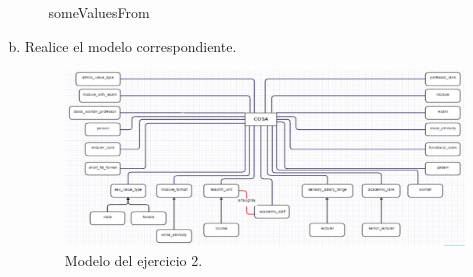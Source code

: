 \documentclass[a4paper,12pt,twoside,final,spanish]{article}
\begin{document}
\begin{enumerate}[a.]
\begin{itemize}
	someValuesFrom \\
		
	\end{itemize}

\item Realice el modelo correspondiente.

\begin{figure}[htbp]
\centerline{\includegraphics[width=\linewidth]{ej2}}
\caption{Modelo del ejercicio 2.}
\label{fig:ej2}
\end{figure}

\end{enumerate}
\end{document}
